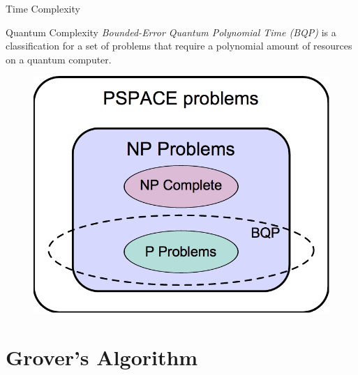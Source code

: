 \documentclass{beamer}
\begin{document}
\begin{frame}{Time Complexity}
	\begin{block}{Quantum Complexity}
		\textit{Bounded-Error Quantum Polynomial Time (BQP)} is a classification for a set of problems that require a polynomial amount of resources on a quantum computer.
	\end{block}
	\begin{figure}[BQP]
		\centering
		\includegraphics[scale=.24]{./bqp.png}
	\end{figure}
\end{frame}

\section{Grover's Algorithm}
\end{document}
